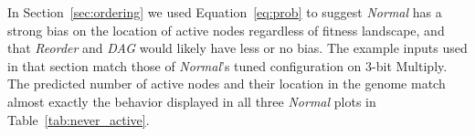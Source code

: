 \documentclass[journal]{IEEEtran}
\begin{document}

In Section~\ref{sec:ordering} we used Equation~\ref{eq:prob} to suggest \emph{Normal}
has a strong bias on the location of active nodes regardless of fitness landscape, and that
\emph{Reorder} and \emph{DAG} would likely have less or no bias.
The example inputs used in that section match those of \emph{Normal}'s tuned
configuration on 3-bit Multiply.  The predicted number of active nodes and their
location in the genome match almost exactly
the behavior displayed in all three \emph{Normal} plots in Table~\ref{tab:never_active}.
\end{document}
